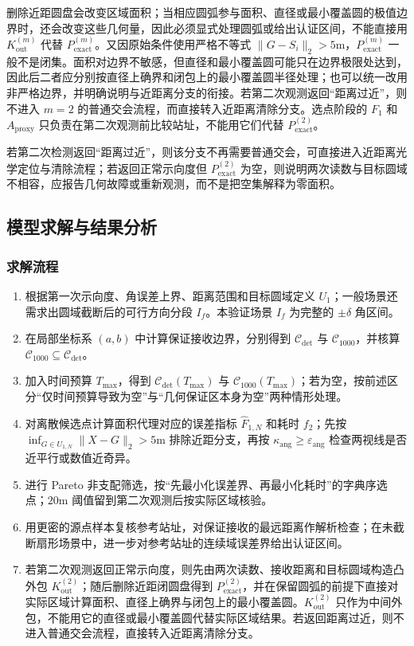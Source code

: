 删除近距圆盘会改变区域面积；当相应圆弧参与面积、直径或最小覆盖圆的极值边界时，还会改变这些几何量，因此必须显式处理圆弧或给出认证区间，不能直接用 $K_{\mathrm{out}}^{(m)}$ 代替 $P_{\mathrm{exact}}^{(m)}$。又因原始条件使用严格不等式 $\lVert G-S_i\rVert_2>5\mathrm{m}$，$P_{\mathrm{exact}}^{(m)}$ 一般不是闭集。面积对边界不敏感，但直径和最小覆盖圆可能只在边界极限处达到，因此后二者应分别按直径上确界和闭包上的最小覆盖圆半径处理；也可以统一改用非严格边界，并明确说明与近距离分支的衔接。若第二次观测返回“距离过近”，则不进入 $m=2$ 的普通交会流程，而直接转入近距离清除分支。选点阶段的 $F_1$ 和 $A_{\mathrm{proxy}}$ 只负责在第二次观测前比较站址，不能用它们代替 $P_{\mathrm{exact}}^{(2)}$。

若第二次检测返回“距离过近”，则该分支不再需要普通交会，可直接进入近距离光学定位与清除流程；若返回正常示向度但 $P_{\mathrm{exact}}^{(2)}$ 为空，则说明两次读数与目标圆域不相容，应报告几何故障或重新观测，而不是把空集解释为零面积。

\subsection{模型求解与结果分析}

\subsubsection{求解流程}

\begin{enumerate}
\item 根据第一次示向度、角误差上界、距离范围和目标圆域定义 $U_1$；一般场景还需求出圆域截断后的可行方向分段 $I_f$。本验证场景 $I_f$ 为完整的 $\pm\delta$ 角区间。
\item 在局部坐标系 $(a,b)$ 中计算保证接收边界，分别得到 $\mathcal C_{\det}$ 与 $\mathcal C_{1000}$，并核算 $\mathcal C_{1000}\subseteq\mathcal C_{\det}$。
\item 加入时间预算 $T_{\max}$，得到 $\mathcal C_{\det}(T_{\max})$ 与 $\mathcal C_{1000}(T_{\max})$；若为空，按前述区分“仅时间预算导致为空”与“几何保证区本身为空”两种情形处理。
\item 对离散候选点计算面积代理对应的误差指标 $\widehat F_{1,N}$ 和耗时 $f_2$；先按 $\inf_{G\in U_{1,N}}\lVert X-G\rVert_2>5\mathrm{m}$ 排除近距分支，再按 $\kappa_{\mathrm{ang}}\ge\varepsilon_{\mathrm{ang}}$ 检查两视线是否近平行或数值近奇异。
\item 进行 Pareto 非支配筛选，按“先最小化误差界、再最小化耗时”的字典序选点；$20\mathrm{m}$ 阈值留到第二次观测后按实际区域核验。
\item 用更密的源点样本复核参考站址，对保证接收的最远距离作解析检查；在未截断扇形场景中，进一步对参考站址的连续域误差界给出认证区间。
\item 若第二次观测返回正常示向度，则先由两次读数、接收距离和目标圆域构造凸外包 $K_{\mathrm{out}}^{(2)}$；随后删除近距闭圆盘得到 $P_{\mathrm{exact}}^{(2)}$，并在保留圆弧的前提下直接对实际区域计算面积、直径上确界与闭包上的最小覆盖圆。$K_{\mathrm{out}}^{(2)}$ 只作为中间外包，不能用它的直径或最小覆盖圆代替实际区域结果。若返回距离过近，则不进入普通交会流程，直接转入近距离清除分支。
\end{enumerate}

